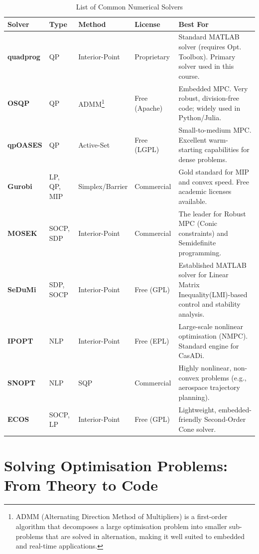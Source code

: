 \begin{table}[h]
	\centering
	\caption{List of Common Numerical Solvers}
	\label{tab:solvers}
	\renewcommand{\arraystretch}{1.3}
	\begin{tabularx}{\textwidth}{@{}l l l l X@{}}
		\toprule
		\textbf{Solver} & \textbf{Type} & \textbf{Method} & \textbf{License} & \textbf{Best For} \\
		\midrule
		\textbf{quadprog} & QP & Interior-Point & Proprietary & Standard MATLAB solver (requires Opt. Toolbox). {Primary solver used in this course}. \\
		\textbf{OSQP} & QP & ADMM\footnote{ADMM (Alternating Direction Method of Multipliers) is a first-order algorithm that decomposes a large optimisation problem into smaller sub-problems that are solved in alternation, making it well suited to embedded and real-time applications.} & Free (Apache) & Embedded MPC. Very robust, division-free code; widely used in Python/Julia. \\
		\textbf{qpOASES} & QP & Active-Set & Free (LGPL) & Small-to-medium MPC. Excellent {warm-starting} capabilities for dense problems. \\
		\textbf{Gurobi} & LP, QP, MIP & Simplex/Barrier & Commercial & Gold standard for MIP and convex speed. Free academic licenses available. \\
		\textbf{MOSEK} & SOCP, SDP & Interior-Point & Commercial & The leader for {Robust MPC} (Conic constraints) and Semidefinite programming. \\
		\textbf{SeDuMi} & SDP, SOCP & Interior-Point & Free (GPL) & Established MATLAB solver for Linear Matrix Inequality(LMI)-based control and stability analysis. \\
		\textbf{IPOPT} & NLP & Interior-Point & Free (EPL) & Large-scale nonlinear optimisation (NMPC). Standard engine for CasADi. \\
		\textbf{SNOPT} & NLP & SQP & Commercial & Highly nonlinear, non-convex problems (e.g., aerospace trajectory planning). \\
		\textbf{ECOS} & SOCP, LP & Interior-Point & Free (GPL) & Lightweight, embedded-friendly Second-Order Cone solver. \\
		\bottomrule
	\end{tabularx}
\end{table}



\section{Solving Optimisation Problems: From Theory to Code}


